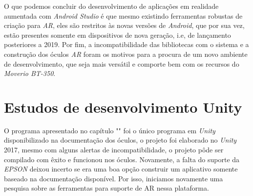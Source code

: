 
O que podemos concluir do desenvolvimento de aplicações em realidade aumentada com \textit{Android Studio} é que mesmo existindo ferramentas robustas de criação para \textit{AR}, eles são restritos às novas versões de \textit{Android}, que por sua vez, estão presentes somente em dispositivos de nova geração, i.e, de lançamento posteriores a 2019. Por fim, a incompatibilidade das bibliotecas com o sistema e a construção dos óculos \textit{AR} foram os motivos para a procura de um novo ambiente de desenvolvimento, que seja mais versátil e comporte bem com os recursos do \textit{Moverio BT-350}.

\section{Estudos de desenvolvimento Unity}

O programa apresentado no capítulo "" foi o único programa em \textit{Unity} disponibilizado na documentação dos óculos, o projeto foi elaborado no \textit{Unity} 2017, mesmo com alguns alertas de incompatibilidade, o projeto pôde ser compilado com êxito e funcionou nos óculos. Novamente, a falta do suporte da \textit{EPSON} deixou incerto se era uma boa opção construir um aplicativo somente baseado na documentação disponível. Por isso, iniciamos novamente uma pesquisa sobre as ferramentas para suporte de AR nessa plataforma.

